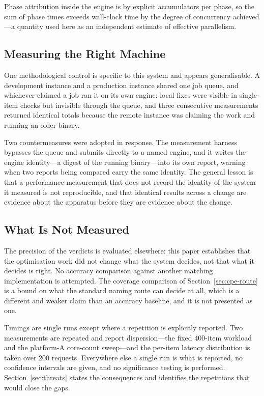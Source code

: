 \documentclass[fleqn,10pt,lineno]{wlpeerj}
\begin{document}
Phase attribution inside the engine is by explicit accumulators per phase, so the sum of phase times exceeds wall-clock time by the degree of concurrency achieved---a quantity used here as an independent estimate of effective parallelism.

\subsection{Measuring the Right Machine}
\label{sec:measuring}
One methodological control is specific to this system and appears generalisable. A development instance and a production instance shared one job queue, and whichever claimed a job ran it on its own engine: local fixes were visible in single-item checks but invisible through the queue, and three consecutive measurements returned identical totals because the remote instance was claiming the work and running an older binary.

Two countermeasures were adopted in response. The measurement harness bypasses the queue and submits directly to a named engine, and it writes the engine identity---a digest of the running binary---into its own report, warning when two reports being compared carry the same identity. The general lesson is that a performance measurement that does not record the identity of the system it measured is not reproducible, and that identical results across a change are evidence about the apparatus before they are evidence about the change.

\subsection{What Is Not Measured}
The precision of the verdicts is evaluated elsewhere: this paper establishes that the optimisation work did not change what the system decides, not that what it decides is right. No accuracy comparison against another matching implementation is attempted. The coverage comparison of Section~\ref{sec:cpe-route} is a bound on what the standard naming route can decide at all, which is a different and weaker claim than an accuracy baseline, and it is not presented as one.

Timings are single runs except where a repetition is explicitly reported. Two measurements are repeated and report dispersion---the fixed 400-item workload and the platform-A core-count sweep---and the per-item latency distribution is taken over 200 requests. Everywhere else a single run is what is reported, no confidence intervals are given, and no significance testing is performed. Section~\ref{sec:threats} states the consequences and identifies the repetitions that would close the gaps.
\end{document}
